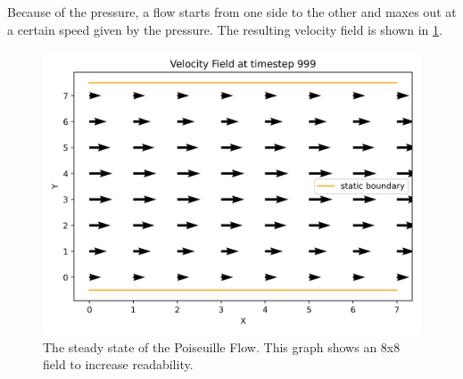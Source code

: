 Because of the pressure, a flow starts from one side to the other and maxes out at a certain speed given by the pressure.
The resulting velocity field is shown in \cref{fig:pf-velocity-field}.
\begin{figure}[H]
    \begin{center}
        \includegraphics[width=0.5\linewidth]{graphs/PoiseuilleFlow/velocity_field_999}
        \caption{The steady state of the Poiseuille Flow. This graph shows an 8x8 field to increase readability.}
        \label{fig:pf-velocity-field}
    \end{center}
\end{figure}

